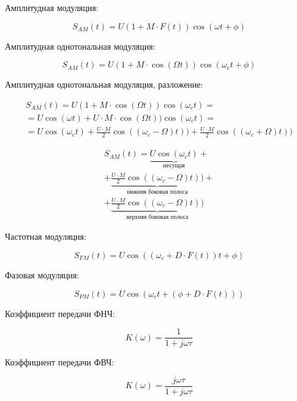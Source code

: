 \documentclass[
  a4paper,
]{book}
\theoremstyle{definition}
\theoremstyle{definition}
\theoremstyle{definition}
\theoremstyle{definition}
\theoremstyle{remark}
\begin{document}
Амплитудная модуляция:

\begin{equation}
S_{AM}(t)=U(1+M \cdot F(t)) \cos{(\omega t+\phi)}
\end{equation}

Амплитудная однотональная модуляция:

\begin{equation}
S_{AM}(t)=U(1+M \cdot \cos{(\Omega t)}) \cos{(\omega_{c} t+\phi)}
\end{equation}

Амплитудная однотональная модуляция, разложение:

\begin{eqnarray}
S_{AM}(t)=U(1+M \cdot \cos{(\Omega t)}) \cos{( \omega_{c} t)} = \nonumber
\\
 = U \cos{(\omega t)} +U \cdot M \cdot \cos{(\Omega t)}) \cos{(\omega_{c} t)} =\nonumber
\\
 = U \cos{(\omega_{c} t)} +\frac{U \cdot M}{2} \cos{((\omega_{c}-\Omega) t)}) + \frac{U \cdot M}{2} \cos{((\omega_{c}+\Omega) t)})
\end{eqnarray}

\begin{eqnarray}
S_{AM}(t)= \underbrace{U \cos{(\omega_{c} t)}}_{\text{несущая}} +\nonumber
\\
+ \underbrace{\frac{U \cdot M}{2} \cos{((\omega_{c}-\Omega) t)})}_{\text{нижняя боковая полоса}} +\nonumber
\\
+\underbrace{\frac{U \cdot M}{2} \cos{((\omega_{c}-\Omega) t)})}_{\text{верхняя боковая полоса}} \nonumber
\end{eqnarray}

Частотная модуляция:

\begin{equation}
S_{FM}(t)=U \cos{((\omega_{c}+D \cdot F(t)) t+\phi)}
\end{equation}

Фазовая модуляция:

\begin{equation}
S_{PM}(t)=U \cos{(\omega_{c} t+(\phi+D \cdot F(t)))}
\end{equation}

Коэффициент передачи ФНЧ:

\begin{equation}
K(\omega)= \frac {1}{1+j\omega \tau}
\end{equation}

Коэффициент передачи ФВЧ:

\begin{equation}
K(\omega)= \frac {j\omega \tau}{1+j\omega \tau}
\end{equation}
\end{document}
